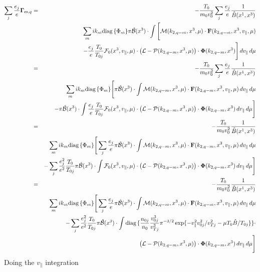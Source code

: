 \begin{eqnarray*}
  \sum_j\frac{e_j}{e}\mathbf{\Gamma}_{\mathrm{es},q} 
  &=&-\frac{T_0}{m_0v_0^2}\sum_j\frac{e_j}{e}\frac{1}{\hat{B}(x^1,x^3)}\\
  &&\sum_m ik_m\mbox{diag}\,\{\Phi_m\}\pi\hat{\mathcal{B}}(x^3)\cdot \int \Bigg[
  \mathcal{M}(k_{2,q-m},x^3,\mu)\cdot\mathbf{F}(k_{2,q-m},x^3,v_\|,\mu)\\
  &&-\frac{e_j}{e}\frac{T_0}{T_{0j}}\mathcal{F}_0(x^3,v_\|,\mu)\cdot
  \left(
    \mathcal{L}-\mathcal{P}(k_{2,q-m},x^3,\mu)
  \right)\cdot\mathbf{\Phi}(k_{2,q-m},x^3)
  \Bigg]\,dv_\|\,d\mu\\
  &=&-\frac{T_0}{m_0v_0^2}\sum_j\frac{e_j}{e}\frac{1}{\hat{B}(x^1,x^3)}\\
  &&\sum_m ik_m\mbox{diag}\,\{\Phi_m\} \Bigg[
  \pi\hat{\mathcal{B}}(x^3)\cdot \int\mathcal{M}(k_{2,q-m},x^3,\mu)\cdot\mathbf{F}(k_{2,q-m},x^3,v_\|,\mu)\,dv_\|\,d\mu\\
  &&-\pi\hat{\mathcal{B}}(x^3)\cdot \int\frac{e_j}{e}\frac{T_0}{T_{0j}}\mathcal{F}_0(x^3,v_\|,\mu)\cdot
  \left(
    \mathcal{L}-\mathcal{P}(k_{2,q-m},x^3,\mu)
  \right)\cdot\mathbf{\Phi}(k_{2,q-m},x^3)
  \,dv_\|\,d\mu\Bigg]\\
  &=&-\frac{T_0}{m_0v_0^2}\frac{1}{\hat{B}(x^1,x^3)}\\
  &&\sum_m ik_m\mbox{diag}\,\{\Phi_m\} \Bigg[
  \sum_j\frac{e_j}{e}\pi\hat{\mathcal{B}}(x^3)\cdot \int\mathcal{M}(k_{2,q-m},x^3,\mu)\cdot\mathbf{F}(k_{2,q-m},x^3,v_\|,\mu)\,dv_\|\,d\mu\\
  &&-\sum_j\frac{e_j^2}{e^2}\frac{T_0}{T_{0j}}\pi\hat{\mathcal{B}}(x^3)\cdot \int\mathcal{F}_0(x^3,v_\|,\mu)\cdot
  \left(
    \mathcal{L}-\mathcal{P}(k_{2,q-m},x^3,\mu)
  \right)\cdot\mathbf{\Phi}(k_{2,q-m},x^3)
  \,dv_\|\,d\mu\Bigg]\\
  &=&-\frac{T_0}{m_0v_0^2}\frac{1}{\hat{B}(x^1,x^3)}\\
  &&\sum_m ik_m\mbox{diag}\,\{\Phi_m\} \Bigg[
  \sum_j\frac{e_j}{e}\pi\hat{\mathcal{B}}(x^3)\cdot \int\mathcal{M}(k_{2,q-m},x^3,\mu)\cdot\mathbf{F}(k_{2,q-m},x^3,v_\|,\mu)\,dv_\|\,d\mu\\
  &&-\sum_j\frac{e_j^2}{e^2}\frac{T_0}{T_{0j}}\pi\hat{\mathcal{B}}(x^3)\cdot \int
  \mbox{diag}\,\{\frac{n_{0j}}{n_0}\frac{v_{0j}^3}{v_{Tj}^3}\pi^{-3/2}\exp\{-v_\|^2v_{0j}^2/v_{Tj}^2-\mu T_0\hat{B}/T_{0j}\}\}\cdot\\
  &&\left(
    \mathcal{L}-\mathcal{P}(k_{2,q-m},x^3,\mu)
  \right)\cdot\mathbf{\Phi}(k_{2,q-m},x^3)
  \,dv_\|\,d\mu\Bigg]
\end{eqnarray*}
Doing the $v_\|$ integration
